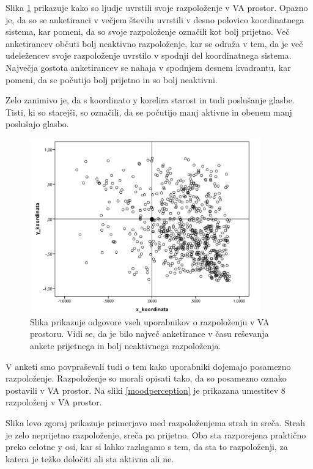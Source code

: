 \documentclass[a4paper, 12pt]{book}
\begin{document}
{Slika \ref{razpolozenjeva} prikazuje kako so ljudje uvrstili svoje razpoloženje v VA prostor. Opazno je, da so se anketiranci v večjem številu uvrstili v desno polovico koordinatnega sistema, kar pomeni, da so svoje razpoloženje označili kot bolj prijetno. Več anketirancev občuti bolj neaktivno razpoloženje, kar se odraža v tem, da je več udeležencev svoje razpoloženje uvrstilo v spodnji del koordinatnega sistema. Največja gostota anketirancev se nahaja v spodnjem desnem kvadrantu, kar pomeni, da se počutijo bolj prijetno in so bolj neaktivni. 

Zelo zanimivo je, da s koordinato y korelira starost in tudi poslušanje glasbe. Tisti, ki so starejši, so označili, da se počutijo manj aktivne in obenem manj poslušajo glasbo. 

\begin{figure}[hbt]
\centering
\includegraphics[width=10cm]{images/vamood.png}

\caption{Slika prikazuje odgovore vseh uporabnikov o razpoloženju v VA prostoru. Vidi se, da je bilo največ anketirance v času reševanja ankete prijetnega in bolj neaktivnega razpoloženja.  }
\label{razpolozenjeva}
\end{figure}

V anketi smo povpraševali tudi o tem kako uporabniki dojemajo posamezno razpoloženje. Razpoloženje so morali opisati tako, da so posamezno oznako postavili v VA prostor. Na sliki \ref{moodperception} je prikazana umestitev 8 razpoloženj v VA prostor. 

Slika levo zgoraj prikazuje primerjavo med razpoloženjema strah in sreča. Strah je zelo neprijetno razpoloženje, sreča pa prijetno. Oba sta razporejena praktično preko celotne y osi, kar si lahko razlagamo s tem, da sta to razpoloženji, za katera je težko določiti ali sta aktivna ali ne. 

}
\end{document}
